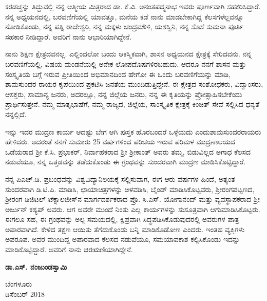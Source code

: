 ಕರಡಚ್ಚನ್ನು ತಿದ್ದುವಲ್ಲಿ ನನ್ನ ಆತ್ಮೀಯ ಮಿತ್ರರಾದ ಡಾ. ಕೆ.ವಿ. ಅನಂತಪದ್ಮನಾಭ ಇವರು ಪೂರ್ಣವಾಗಿ ಸಹಕರಿಸಿದ್ದಾರೆ. ನನ್ನ ಅಧ್ಯಯನದಲ್ಲಿ, ಬರವಣಿಗೆಯಲ್ಲಿ ಯಾವತ್ತೂ, ಮನೆಯ ಕಡೆ ನಾನು ಮಾಡಬೇಕಾಗಿದ್ದ ಕೆಲಸಗಳೆಲ್ಲವನ್ನೂ ನೋಡಿಕೊಂಡು, ನನ್ನ ಪತ್ನಿ ರಾಜೇಶ್ವರಿ, ನನ್ನ ಮಕ್ಕಳು ಚಂದ್ರಮೌಳಿ, ಯಶಸ್ವಿನಿ, ನನ್ನ ಸೊಸೆ ಸುಮನಾ ಪೂರ್ತಿ ಸಹಕಾರ ನೀಡಿದ್ದಾರೆ. ಅವರಿಗೆ ನಾನು ಆಭಾರಿಯಾಗಿದ್ದೇನೆ. 

ನಾನು ಶಿಕ್ಷಣ ಕ್ಷೇತ್ರದವನಲ್ಲ. ಎಲ್ಲಿಂದಲೋ ಬಂದು ಆಕಸ್ಮಿಕವಾಗಿ, ಶಾಸನ ಅಧ್ಯಯನದ ಕ್ಷೇತ್ರಕ್ಕೆ ಸೇರಿದವನು. ನನ್ನ ಬರವಣಿಗೆಯಲ್ಲಿ, ವಿಷಯ ಮಂಡನೆಯಲ್ಲಿ ಅನೇಕ ಲೋಪದೊಷಗಳಿರಬಹುದು. ಆದರೂ ನನಗೆ ಶಾಸನ ಮತ್ತು ಸಂಸ್ಕೃತಿಯ ಬಗ್ಗೆ ಇರುವ ಪ್ರೀತಿಯಿಂದ ಅಭಿಮಾನದಿಂದ ಹೇಗೋ ಈ ಒಂದು ಬರವಣಿಗೆಯನ್ನು ಮಾಡಿ, ಶಾಮಸುಂದರ ರಾಯರ ಕೃಪೆಯಿಂದ ಪ್ರಕಟಿಸಿ ಜನತೆಯ ಮುಂದಿಡುತ್ತಿದ್ದೇನೆ. ಈ ಕ್ಷೇತ್ರದ ಸಂಶೋಧಕರು, ವಿದ್ವಾಂಸರು, ಆಸಕ್ತರು, ಸಾಮಾನ್ಯ ಜನರು, ಅದರಲ್ಲೂ, ನನ್ನ ಜಿಲ್ಲೆಯ ಜನರು, ನನ್ನ ಈ ಕೃತಿಯನ್ನು ಪ್ರೋತ್ಸಾಹಿಸಬೇಕೆಂದು ಪ್ರಾರ್ಥಿಸುತ್ತೇನೆ. ನಮ್ಮ ಮಾತೃಭಾಷೆಗೆ, ನಮ್ಮ ರಾಜ್ಯದ, ಜಿಲ್ಲೆಯ, ಸಾಂಸ್ಕೃತಿಕ ಕ್ಷೇತ್ರಕ್ಕೆ ಕಿಂಚಿತ್​ ಸೇವೆ ಸಲ್ಲಿಸಿದ ಧನ್ಯತೆ ನನ್ನಲ್ಲಿದೆ.

ಇನ್ನು ಇದರ ಮುದ್ರಣ ಕಾರ್ಯ ಆದಷ್ಟು ಬೇಗ ಆಗಿ ಪುಸ್ತಕ ಹೊರಬಂದರೆ ಒಳ್ಳೆಯದು ಎಂದು\break ಶಾಮಸುಂದರರಾಯರು ಹೇಳಿದರು. ಅದರಂತೆ ನನಗೆ ಸುಮಾರು 25 ವರ್ಷಗಳಿಂದ ಪರಿಚಯ ಇರುವ ಪರಿಮಳ ಮುದ್ರಣಾಲಯದ ಒಡೆಯರಾದ ಶ‍್ರೀ ಕೆ.ಸಿ. ಪ್ರಭಾಕರ್​, ನಿರ್ವಾಹಕರಾದ ಶ‍್ರೀ ಶ‍್ರೀಕಾಂತ್​ ಅವರು ತಮ್ಮ, ಬಿಡುವಿಲ್ಲದ ಅಗಾಧ ಕೆಲಸದ ನಡುವೆಯೂ, ನನ್ನ ಒತ್ತಡವನ್ನು ತಡೆದುಕೊಂಡು ಈ ಗ್ರಂಥವನ್ನು ಸುಂದರವಾಗಿ ಮುದ್ರಣ ಮಾಡಿಸಿಕೊಟ್ಟಿದ್ದಾರೆ.

ನನ್ನ ಪಿಎಚ್​.ಡಿ. ಪ್ರಬಂಧವನ್ನು ವಿಶ್ವವಿದ್ಯಾನಿಲಯಕ್ಕೆ ಸಲ್ಲಿಸುವಾಗ, ಈಗ ಆರು ವರ್ಷಗಳ ಹಿಂದೆ, ಅತ್ಯಂತ ಸುಂದರವಾಗಿ ಡಿ.ಟಿ.ಪಿ. ಮಾಡಿಸಿ, ಛಾಯಾಚಿತ್ರಗಳನ್ನು ಅಳವಡಿಸಿ, ಬೈಂಡ್​ ಮಾಡಿಸಿಕೊಟ್ಟವರು, ಶ‍್ರೀರಂಗಪಟ್ಟಣದ, ಶ‍್ರೀರಂಗ ಡಿಜಿಟಲ್​ ಟೆಕ್ನಾಲಜೀಸ್​ನ ಮಾರ್ಗದರ್ಶಕರಾದ ಪ್ರೊ. ಸಿ.ಎಸ್​. ಯೋಗಾನಂದ್​ ಮತ್ತು ವ್ಯವಸ್ಥಾಪಕರಾದ ಶ‍್ರೀ ಅರ್ಜುನ್​ ಕಶ್ಯಪ್ ಅವರು. ಆಗ ಅವರೇ ಮುಂದೆ ನಿಂತು ಎಲ್ಲ ಕಾರ್ಯಗಳನ್ನು ಸುಸೂತ್ರವಾಗಿ ಆಗುಮಾಡಿಸಿಕೊಟ್ಟರು. ಈಗಲೂ ಸಹ, ಈ ಗ್ರಂಥವನ್ನು ಅಲ್ಪ ಸಮಯದಲ್ಲಿ, ಕ್ಷಿಪ್ರವಾಗಿ ಸಿದ್ಧಪಡಿಸಿಕೊಡುವುದರಲ್ಲಿ ಅವರುಗಳ ಪಾತ್ರ ಅಪಾರವಾಗಿದೆ. ಕೇಳಿದ ತಕ್ಷಣ ಆಯಿತು ತೆಗೆದುಕೊಂಡು ಬನ್ನಿ ಮಾಡಿಕೊಡೋಣ ಎಂದರು. ಇಂತಹ ವ್ಯಕ್ತಿಗಳು ಅಪರೂಪ. ಅವರ ಮುಂದಿದ್ದ ಅಪಾರವಾದ ಕೆಲಸದ ನಡುವೆಯೂ, ಸಮಯಾವಕಾಶ ಕಲ್ಪಿಸಿಕೊಂಡು ಇದನ್ನು ಮಾಡಿಕೊಟ್ಟಿದ್ದಾರೆ. ಅವರಿಗೆ ನಾನು ಚಿರಋಣಿಯಾಗಿದ್ದೇನೆ.

\begin{flushright}
\textbf{ಡಾ.ಎಸ್​. ನಂಜುಂಡಸ್ವಾಮಿ}
\end{flushright}

\noindent
ಬೆಂಗಳೂರು \\ ಡಿಸೆಂಬರ್​ 2018

